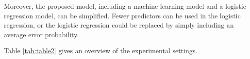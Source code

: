 \documentclass[12pt, a4paper, titlepage]{article}
\begin{document}
Moreover, the proposed model, including a machine learning model and a logistic regression model, can be simplified. Fewer predictors can be used in the logistic regression, or the logistic regression could be replaced by simply including an average error probability.


Table \ref{tab:table2} gives an overview of the experimental settings. 
\end{document}
